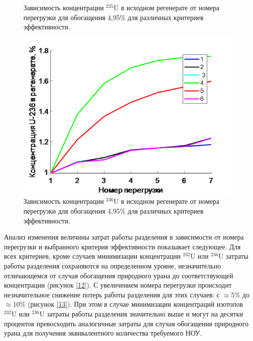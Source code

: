 \begin{figure}[ht]
\begin{minipage}{.5\textwidth}
      \caption{Зависимость концентрации $^{235}$U в исходном регенерате от номера перегрузки для обогащения 4,95\% для различных критериев эффективности.}
      \label{10}
    \end{minipage}
    \begin{minipage}{.5\textwidth}
        \centering
        \includegraphics[width=.8\linewidth]{images/net/11}  
        \caption{Зависимость концентрации $^{236}$U в исходном регенерате от номера перегрузки для обогащения 4,95\% для различных критериев эффективности.}
        \label{11}
      \end{minipage}
\end{figure}


Анализ изменения величины затрат работы разделения в зависимости от номера перегрузки и выбранного критерия эффективности показывает следующее. Для всех критериев, кроме случаев минимизации концентрации $^{232}$U или $^{236}$U затраты работы разделения сохраняются на определенном уровне, незначительно отличающемся от случая обогащения природного урана до соответствующей концентрации (рисунок \ref{12}). С увеличением номера перегрузки происходит незначительное снижение потерь работы разделения для этих случаев: с $\approx$5\% до $\approx$10\% (рисунок \ref{13}). При этом в случае минимизации концентраций изотопов $^{232}$U или $^{236}$U затраты работы разделения значительно выше и  могут на десятки процентов превосходить аналогичные затраты для случая обогащения природного урана для получения эквивалентного количества требуемого НОУ.

